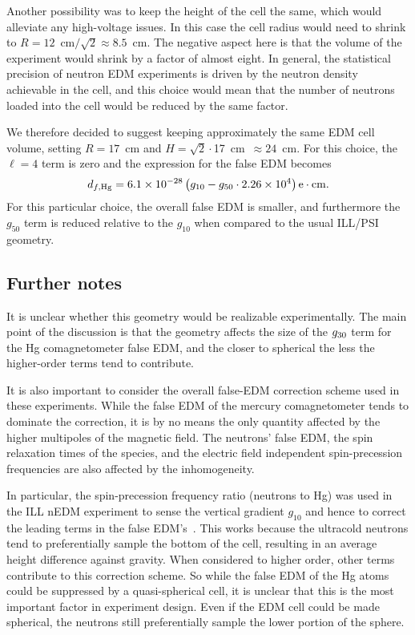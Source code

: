 \documentclass[preprint,12pt]{elsarticle}
\begin{document}
Another possibility was to keep the height of the cell the same, which
would alleviate any high-voltage issues.  In this case the cell radius
would need to shrink to $R=12$~cm$/\sqrt{2}\approx 8.5$~cm.  The
negative aspect here is that the volume of the experiment would shrink
by a factor of almost eight.  In general, the statistical precision of
neutron EDM experiments is driven by the neutron density achievable in
the cell, and this choice would mean that the number of neutrons
loaded into the cell would be reduced by the same factor.

We therefore decided to suggest keeping approximately the same EDM
cell volume, setting $R=17$~cm and $H=\sqrt{2}\cdot$17~cm~$\approx
24$~cm.  For this choice, the $\ell=4$ term is zero and the expression
for the false EDM becomes
\begin{equation}
d_{f,\rm Hg} = \num{6.1e-28}\left(g_{10} - g_{50}\cdot\num{2.26e4}\right)\mathrm{e}\cdot\mathrm{cm}.
\end{equation}
For this particular choice, the overall false EDM is smaller, and
furthermore the $g_{50}$ term is reduced relative to the $g_{10}$ when
compared to the usual ILL/PSI geometry.


\subsection{Further notes}

It is unclear whether this geometry would be realizable
experimentally.  The main point of the discussion is that the geometry
affects the size of the $g_{\rm 30}$ term for the Hg comagnetometer
false EDM, and the closer to spherical the less the higher-order terms
tend to contribute.

It is also important to consider the overall false-EDM correction
scheme used in these experiments.  While the false EDM of the mercury
comagnetometer tends to dominate the correction, it is by no means the
only quantity affected by the higher multipoles of the magnetic field.
The neutrons' false EDM, the spin relaxation times of the species, and
the electric field independent spin-precession frequencies are also
affected by the inhomogeneity.

In particular, the spin-precession frequency ratio (neutrons to Hg)
was used in the ILL nEDM experiment to sense the vertical gradient
$g_{10}$ and hence to correct the leading terms in the false
EDM's~\cite{bib:baker,bib:pendlebury}.  This works because the
ultracold neutrons tend to preferentially sample the bottom of the
cell, resulting in an average height difference against gravity.  When
considered to higher order, other terms contribute to this correction
scheme.  So while the false EDM of the Hg atoms could be suppressed by
a quasi-spherical cell, it is unclear that this is the most important
factor in experiment design.  Even if the EDM cell could be made
spherical, the neutrons still preferentially sample the lower portion
of the sphere.
\end{document}

